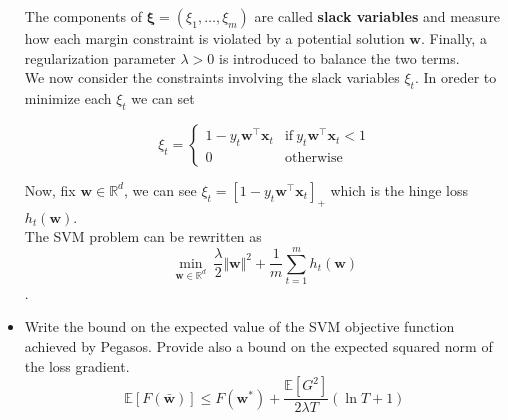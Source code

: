 \begin{itemize}
        The components of $\boldsymbol{\xi} = (\xi_1, \dots, \xi_m)$ are called \textbf{slack variables} and measure how each margin constraint is violated by a potential solution $\boldsymbol{w}$. Finally, a regularization parameter $\lambda > 0$ is introduced to balance the two terms.\\

        We now consider the constraints involving the slack variables $\xi_t$. In oreder to minimize each $\xi_t$ we can set
        
        \begin{equation}
            \xi_t =
            \begin{cases}
                1 - y_t \boldsymbol{w}^\top \boldsymbol{x}_t & \text{if} \ y_t \boldsymbol{w}^\top \boldsymbol{x}_t < 1 \\                
                0 & \text{otherwise}
            \end{cases}
        \end{equation}
        
        Now, fix $\boldsymbol{w} \in \mathbb{R}^d$, we can see $\xi_t = \left[1 - y_t \boldsymbol{w}^\top \boldsymbol{x}_t \right]_+$ which is the hinge loss  $h_{t}(\boldsymbol{w})$.\\

        The SVM problem can be rewritten as $$\underset{\boldsymbol{w} \in \mathbb{R}^d}{\min} \ \frac{\lambda}{2} \Vert \boldsymbol{w} \Vert^2 + \frac{1}{m} \sum_{t = 1}^m h_{t}(\boldsymbol{w})$$.\\


    \newpage
    \item Write the bound on the expected value of the SVM objective function achieved by Pegasos.
Provide also a bound on the expected squared norm of the loss gradient.\\
        
        $$
        \mathbb{E}\left[F(\bar{\boldsymbol{w}})\right] \leq F(\boldsymbol{w}^*) + \frac{\mathbb{E}\left[G^2\right]}{2 \lambda T} (\ln T + 1)
        $$
            

\end{itemize}

